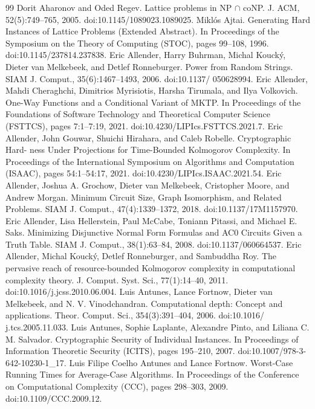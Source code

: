 \documentclass[10pt,a4paper]{article}
\begin{document}
\begin{thebibliography}{99}
 Dorit Aharonov and Oded Regev. Lattice problems in NP $\cap$ coNP. J. ACM, 52(5):749–765, 2005. doi:10.1145/1089023.1089025.
 Miklós Ajtai. Generating Hard Instances of Lattice Problems (Extended Abstract). In Proceedings of the Symposium on the Theory of Computing (STOC), pages 99–108, 1996. doi:10.1145/237814.237838.
 Eric Allender, Harry Buhrman, Michal Koucký, Dieter van Melkebeek, and Detlef Ronneburger. Power from Random Strings. SIAM J. Comput., 35(6):1467–1493, 2006. doi:10.1137/ 050628994.
 Eric Allender, Mahdi Cheraghchi, Dimitrios Myrisiotis, Harsha Tirumala, and Ilya Volkovich. One-Way Functions and a Conditional Variant of MKTP. In Proceedings of the Foundations of Software Technology and Theoretical Computer Science (FSTTCS), pages 7:1–7:19, 2021. doi:10.4230/LIPIcs.FSTTCS.2021.7.
 Eric Allender, John Gouwar, Shuichi Hirahara, and Caleb Robelle. Cryptographic Hard- ness Under Projections for Time-Bounded Kolmogorov Complexity. In Proceedings of the International Symposium on Algorithms and Computation (ISAAC), pages 54:1–54:17, 2021. doi:10.4230/LIPIcs.ISAAC.2021.54.
 Eric Allender, Joshua A. Grochow, Dieter van Melkebeek, Cristopher Moore, and Andrew Morgan. Minimum Circuit Size, Graph Isomorphism, and Related Problems. SIAM J. Comput., 47(4):1339–1372, 2018. doi:10.1137/17M1157970.
 Eric Allender, Lisa Hellerstein, Paul McCabe, Toniann Pitassi, and Michael E. Saks. Minimizing Disjunctive Normal Form Formulas and AC0 Circuits Given a Truth Table. SIAM J. Comput., 38(1):63–84, 2008. doi:10.1137/060664537.
 Eric Allender, Michal Koucký, Detlef Ronneburger, and Sambuddha Roy. The pervasive reach of resource-bounded Kolmogorov complexity in computational complexity theory. J. Comput. Syst. Sci., 77(1):14–40, 2011. doi:10.1016/j.jcss.2010.06.004.
 Luis Antunes, Lance Fortnow, Dieter van Melkebeek, and N. V. Vinodchandran. Computational depth: Concept and applications. Theor. Comput. Sci., 354(3):391–404, 2006. doi:10.1016/ j.tcs.2005.11.033.
 Luis Antunes, Sophie Laplante, Alexandre Pinto, and Liliana C. M. Salvador. Cryptographic Security of Individual Instances. In Proceedings of Information Theoretic Security (ICITS), pages 195–210, 2007. doi:10.1007/978-3-642-10230-1\_17.
 Luis Filipe Coelho Antunes and Lance Fortnow. Worst-Case Running Times for Average-Case Algorithms. In Proceedings of the Conference on Computational Complexity (CCC), pages 298–303, 2009. doi:10.1109/CCC.2009.12.

\end{thebibliography}
\end{document}
